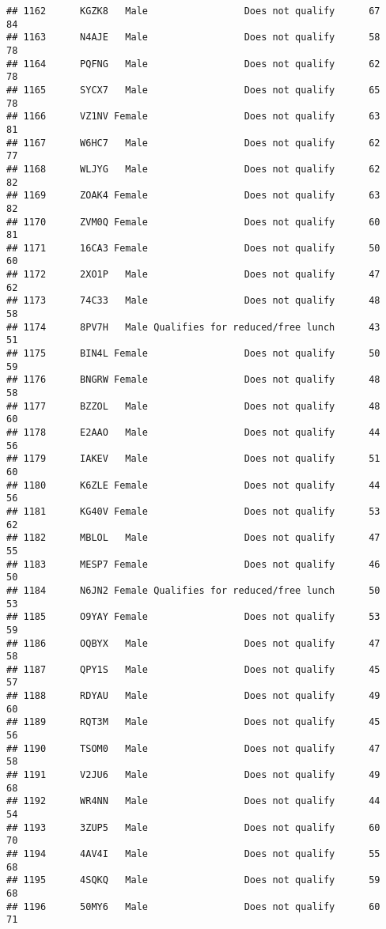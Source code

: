 \documentclass[
]{article}
\begin{document}
\begin{verbatim}
## 1162      KGZK8   Male                 Does not qualify      67       84
## 1163      N4AJE   Male                 Does not qualify      58       78
## 1164      PQFNG   Male                 Does not qualify      62       78
## 1165      SYCX7   Male                 Does not qualify      65       78
## 1166      VZ1NV Female                 Does not qualify      63       81
## 1167      W6HC7   Male                 Does not qualify      62       77
## 1168      WLJYG   Male                 Does not qualify      62       82
## 1169      ZOAK4 Female                 Does not qualify      63       82
## 1170      ZVM0Q Female                 Does not qualify      60       81
## 1171      16CA3 Female                 Does not qualify      50       60
## 1172      2XO1P   Male                 Does not qualify      47       62
## 1173      74C33   Male                 Does not qualify      48       58
## 1174      8PV7H   Male Qualifies for reduced/free lunch      43       51
## 1175      BIN4L Female                 Does not qualify      50       59
## 1176      BNGRW Female                 Does not qualify      48       58
## 1177      BZZOL   Male                 Does not qualify      48       60
## 1178      E2AAO   Male                 Does not qualify      44       56
## 1179      IAKEV   Male                 Does not qualify      51       60
## 1180      K6ZLE Female                 Does not qualify      44       56
## 1181      KG40V Female                 Does not qualify      53       62
## 1182      MBLOL   Male                 Does not qualify      47       55
## 1183      MESP7 Female                 Does not qualify      46       50
## 1184      N6JN2 Female Qualifies for reduced/free lunch      50       53
## 1185      O9YAY Female                 Does not qualify      53       59
## 1186      OQBYX   Male                 Does not qualify      47       58
## 1187      QPY1S   Male                 Does not qualify      45       57
## 1188      RDYAU   Male                 Does not qualify      49       60
## 1189      RQT3M   Male                 Does not qualify      45       56
## 1190      TSOM0   Male                 Does not qualify      47       58
## 1191      V2JU6   Male                 Does not qualify      49       68
## 1192      WR4NN   Male                 Does not qualify      44       54
## 1193      3ZUP5   Male                 Does not qualify      60       70
## 1194      4AV4I   Male                 Does not qualify      55       68
## 1195      4SQKQ   Male                 Does not qualify      59       68
## 1196      50MY6   Male                 Does not qualify      60       71

\end{verbatim}
\end{document}
